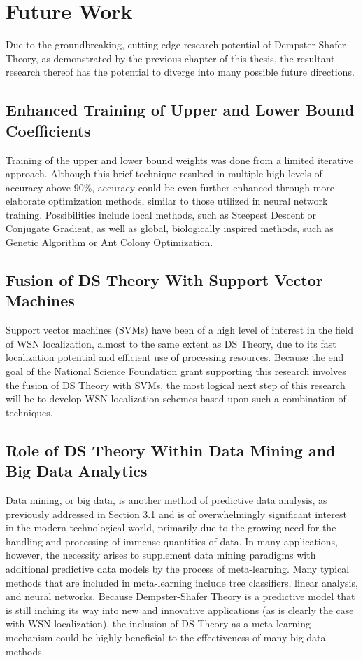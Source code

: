 \documentclass[12pt]{uthesis-v12}  %
\begin{document}
\section{Future Work}

Due to the groundbreaking, cutting edge research potential of Dempster-Shafer Theory, as demonstrated by the previous chapter of this thesis, the resultant research thereof has the potential to diverge into many possible future directions.

\subsection{Enhanced Training of Upper and Lower Bound Coefficients}

Training of the upper and lower bound weights was done from a limited iterative approach. Although this brief technique resulted in multiple high levels of accuracy above 90\%, accuracy could be even further enhanced through more elaborate optimization methods, similar to those utilized in neural network training. Possibilities include local methods, such as Steepest Descent or Conjugate Gradient, as well as global, biologically inspired methods, such as Genetic Algorithm or Ant Colony Optimization.

\subsection{Fusion of DS Theory With Support Vector Machines}

Support vector machines (SVMs) have been of a high level of interest in the field of WSN localization, almost to the same extent as DS Theory, due to its fast localization potential and efficient use of processing resources. Because the end goal of the National Science Foundation grant supporting this research involves the fusion of DS Theory with SVMs, the most logical next step of this research will be to develop WSN localization schemes based upon such a combination of techniques.

\subsection{Role of DS Theory Within Data Mining and Big Data Analytics}

Data mining, or big data, is another method of predictive data analysis, as previously addressed in Section 3.1 and is of overwhelmingly significant interest in the modern technological world, primarily due to the growing need for the handling and processing of immense quantities of data. In many applications, however, the necessity arises to supplement data mining paradigms with additional predictive data models by the process of meta-learning. Many typical methods that are included in meta-learning include tree classifiers, linear analysis, and neural networks. Because Dempster-Shafer Theory is a predictive model that is still inching its way into new and innovative applications (as is clearly the case with WSN localization), the inclusion of DS Theory as a meta-learning mechanism could be highly beneficial to the effectiveness of many big data methods.
\end{document}
